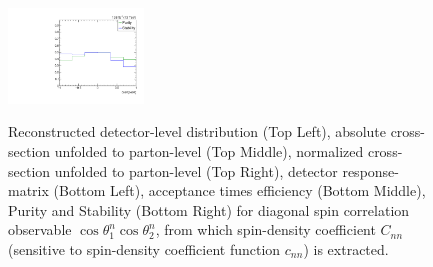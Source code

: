 \begin{figure}[htb]
\begin{center}
 \includegraphics[width=0.32\textwidth]{fig_fullRun2UL/unfolding/combined/PurStab_c_nn.pdf} \\
\caption{Reconstructed detector-level distribution (Top Left), absolute cross-section unfolded to parton-level (Top Middle), normalized cross-section unfolded to parton-level (Top Right), detector response-matrix (Bottom Left), acceptance times efficiency (Bottom Middle), Purity and Stability (Bottom Right) for diagonal spin correlation observable $\cos\theta_{1}^{n}\cos\theta_{2}^{n}$, from which spin-density coefficient $C_{nn}$ (sensitive to spin-density coefficient function $c_{n n}$) is extracted.}
\label{fig:c_nn}
\end{center}
\end{figure}
\clearpage
